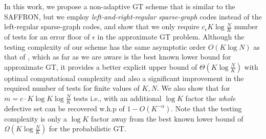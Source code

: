 \documentclass[conference,twocolumn]{IEEEtran}
\begin{document}
In this work, we propose a non-adaptive GT scheme that is similar to the SAFFRON, but we employ \textit{left-and-right-regular sparse-graph} codes instead of the left-regular sparse-graph codes, and show that we only require $c_\epsilon K\log \frac{N}{K}$ number of tests for an error floor of $\epsilon$ in the approximate GT problem.
Although the testing complexity of our scheme has the same asymptotic order $O(K\log N)$ as that of \cite{lee2015saffron}, which as far as we are aware is the best known lower bound for approximate GT, it provides a better explicit upper bound of $\Theta(K\log \frac{N}{K})$ with optimal computational complexity and also a significant improvement in the required number of tests for finite values of $K,N$. 
We also show that for $m=c\cdot K\log K \log \frac{N}{K}$ tests  i.e., with an additional $\log K$ factor the \textit{whole} defective set can be recovered w.h.p of $1-O(K^{-\alpha})$. Note that the testing complexity is only a $\log K$ factor away from the best known lower bound of $\Omega(K\log \frac{N}{K})$ \cite{chan2014non} for the probabilistic GT.
\end{document}
